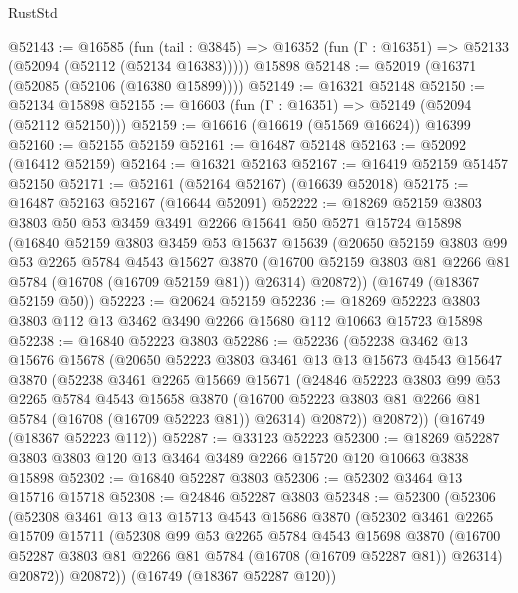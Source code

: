 \begin{lexlean}{RustStd}
\begin{coremodule}
@52143 := @16585
    (fun (tail : @3845) => @16352 (fun (Γ : @16351) => @52133 (@52094 (@52112 (@52134 @16383)))))
    @15898
@52148 := @52019 (@16371 (@52085 (@52106 (@16380 @15899))))
@52149 := @16321 @52148
@52150 := @52134 @15898
@52155 := @16603 (fun (Γ : @16351) => @52149 (@52094 (@52112 @52150)))
@52159 := @16616 (@16619 (@51569 @16624)) @16399
@52160 := @52155 @52159
@52161 := @16487 @52148
@52163 := @52092 (@16412 @52159)
@52164 := @16321 @52163
@52167 := @16419 @52159 @51457 @52150
@52171 := @52161 (@52164 @52167) (@16639 @52018)
@52175 := @16487 @52163 @52167 (@16644 @52091)
@52222 := @18269
    @52159
    @3803
    @3803
    @50
    @53
    @3459
    @3491
    @2266
    @15641
    @50
    @5271
    @15724
    @15898
    (@16840
      @52159
      @3803
      @3459
      @53
      @15637
      @15639
      (@20650
        @52159
        @3803
        @99
        @53
        @2265
        @5784
        @4543
        @15627
        @3870
        (@16700 @52159 @3803 @81 @2266 @81 @5784 (@16708 (@16709 @52159 @81)) @26314)
        @20872))
    (@16749 (@18367 @52159 @50))
@52223 := @20624 @52159
@52236 := @18269 @52223 @3803 @3803 @112 @13 @3462 @3490 @2266 @15680 @112 @10663 @15723 @15898
@52238 := @16840 @52223 @3803
@52286 := @52236
    (@52238
      @3462
      @13
      @15676
      @15678
      (@20650
        @52223
        @3803
        @3461
        @13
        @13
        @15673
        @4543
        @15647
        @3870
        (@52238
          @3461
          @2265
          @15669
          @15671
          (@24846
            @52223
            @3803
            @99
            @53
            @2265
            @5784
            @4543
            @15658
            @3870
            (@16700 @52223 @3803 @81 @2266 @81 @5784 (@16708 (@16709 @52223 @81)) @26314)
            @20872))
        @20872))
    (@16749 (@18367 @52223 @112))
@52287 := @33123 @52223
@52300 := @18269 @52287 @3803 @3803 @120 @13 @3464 @3489 @2266 @15720 @120 @10663 @3838 @15898
@52302 := @16840 @52287 @3803
@52306 := @52302 @3464 @13 @15716 @15718
@52308 := @24846 @52287 @3803
@52348 := @52300
    (@52306
      (@52308
        @3461
        @13
        @13
        @15713
        @4543
        @15686
        @3870
        (@52302
          @3461
          @2265
          @15709
          @15711
          (@52308
            @99
            @53
            @2265
            @5784
            @4543
            @15698
            @3870
            (@16700 @52287 @3803 @81 @2266 @81 @5784 (@16708 (@16709 @52287 @81)) @26314)
            @20872))
        @20872))
    (@16749 (@18367 @52287 @120))

\end{coremodule}
\end{lexlean}
